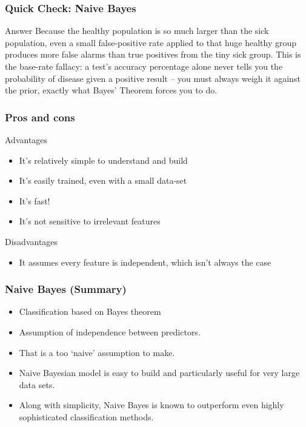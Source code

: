 \begin{frame}[fragile]\frametitle{Quick Check: Naive Bayes}
\begin{block}{Answer}
Because the healthy population is so much larger than the sick population, even a small
false-positive rate applied to that huge healthy group produces more false alarms than true
positives from the tiny sick group. This is the base-rate fallacy: a test's accuracy
percentage alone never tells you the probability of disease given a positive result -- you
must always weigh it against the prior, exactly what Bayes' Theorem forces you to do.
\end{block}
\end{frame}

\begin{frame}[fragile]\frametitle{Pros and cons}
Advantages
\begin{itemize}
\item     It's relatively simple to understand and build
\item     It's easily trained, even with a small data-set
\item     It's fast!
\item     It's not sensitive to irrelevant features
\end{itemize}
Disadvantages
\begin{itemize}
\item     It assumes every feature is independent, which isn't always the case
\end{itemize}
\end{frame}




\begin{frame}[fragile]\frametitle{Naive Bayes (Summary)}
\begin{itemize}
\item Classification based on Bayes theorem
\item Assumption of independence between predictors.
\item That is a too `naive' assumption to make.
\item Naive Bayesian model is easy to build and particularly useful for very large data sets. 
\item Along with simplicity, Naive Bayes is known to outperform even highly sophisticated classification methods.
\end{itemize}
\end{frame}


